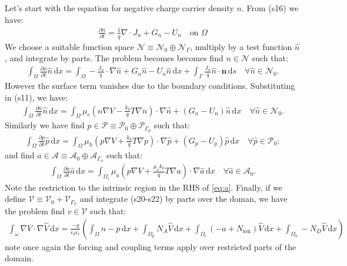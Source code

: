 \documentclass[a4paper,11pt]{article}
\renewcommand{\vec}[1]{\mathbf{#1}}
\begin{document}
Let's start with the equation for negative charge carrier density $n$. From (s16) we have:
\begin{align}
  \frac{\partial n}{\partial t} = \frac{1}{q}\nabla\cdot J_n + G_n - U_n \quad \textrm{on
  }\Omega
\end{align}
We choose a suitable function space $\mathcal{N}\equiv \mathcal{N}_0 \oplus \mathcal{N}_{\Gamma}$, multiply by a test function $\hat{n}$, and
integrate by parts. The problem becomes becomes find $n\in \mathcal{N}$ such that:
\begin{align}
  \int_\Omega \frac{\partial n}{\partial t}\hat{n} \,\mathrm{d}x = 
   \int_\Omega -\frac{J_n}{q} \cdot \nabla\hat{n} + G_n\hat{n} - U_n\hat{n} \,\mathrm{d}x
   + \int_\Gamma \frac{J_n}{q}  \hat{n} \cdot \vec{n} \,\mathrm{d}s \quad
  \forall \hat{n} \in \mathcal{N}_0.
\end{align}
However the surface term vanishes due to the boundary
conditions. Substituting in (s11), we have:
\begin{align}
  \int_\Omega \frac{\partial n}{\partial t}\hat{n} \,\mathrm{d}x = 
  \int_\Omega \mu_e\left(n \nabla V  
  - \frac{k_b}{q} T  \nabla n \right)\cdot \nabla \hat{n} 
  + \left(G_n - U_n\right)\hat{n} \,\mathrm{d}x \quad
  \forall \hat{n} \in \mathcal{N}_0.\label{eq:n}
\end{align}
Similarly we have find $p\in \mathcal{P}\equiv\mathcal{P}_0 \oplus\mathcal{P}_{\Gamma_p}$ such that:
\begin{align}
  \int_\Omega \frac{\partial p}{\partial t} \hat{p}\,\mathrm{d}x = 
  \int_\Omega \mu_h  \left(p \nabla V  
  + \frac{k_b}{q} T  \nabla p\right) \cdot \nabla \hat{p} 
  + \left(G_p - U_p\right)\hat{p} \,\mathrm{d}x \quad
  \forall \hat{p} \in \mathcal{P}_0;\label{eq:p}
\end{align}
and find $a\in \mathcal{A}\equiv\mathcal{A}_0 \oplus\mathcal{A}_{\Gamma_a}$ such that:
\begin{align}
  \int_\Omega \frac{\partial a}{\partial t} \hat{a}\,\mathrm{d}x = 
  \int_{\Omega_i} \mu_a  \left(p \nabla V 
  + \frac{\mu_ak_b}{q} T  \nabla a\right) \cdot \nabla \hat{a} 
  \,\mathrm{d}x \quad
  \forall \hat{a} \in \mathcal{A}_0. \label{eq:a}
\end{align}
Note the restriction to the intrinsic region in the RHS of
\eqref{eq:a}. Finally, if we define $\mathcal{V} \equiv \mathcal{V}_0 +
\mathcal{V}_{\Gamma_V}$ and integrate (s20-s22) by parts over the doman, we
have the problem find $v\in \mathcal{V}$ such that:
\begin{align}
  \int_\omega \nabla V \cdot \nabla\hat{V} \,\mathrm{d}x =
  \frac{-q}{\epsilon_0\epsilon_r}\left(\int_{\Omega} n - p \,\mathrm{d}x +
  \int_{\Omega_p} N_A \hat{V} \,\mathrm{d}x + 
  \int_{\Omega_i} (-a + N_{\mathrm{ion}}) \hat{V} \,\mathrm{d}x + 
  \int_{\Omega_n} - N_D \hat{V} \,\mathrm{d}x \right)
\end{align}
note once again the forcing and coupling terms apply over restricted parts
of the domain.
 
\end{document}
